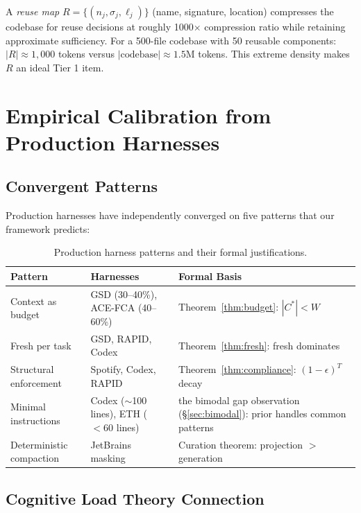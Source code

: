 \documentclass[11pt, a4paper, logo, copyright]{googledeepmind}
\begin{document}
A \emph{reuse map} $R = \{(n_j, \sigma_j, \ell_j)\}$ (name, signature, location) compresses the codebase for reuse decisions at roughly 1000$\times$ compression ratio while retaining approximate sufficiency. For a 500-file codebase with 50 reusable components: $|R| \approx 1{,}000$ tokens versus $|\text{codebase}| \approx 1.5$M tokens. This extreme density makes $R$ an ideal Tier 1 item.


\section{Empirical Calibration from Production Harnesses}
\label{sec:empirical}

\subsection{Convergent Patterns}

Production harnesses have independently converged on five patterns that our framework predicts:

\begin{table}[H]
\centering
\small
\begin{tabularx}{\textwidth}{lXX}
\toprule
\textbf{Pattern} & \textbf{Harnesses} & \textbf{Formal Basis} \\
\midrule
Context as budget & GSD (30--40\%), ACE-FCA (40--60\%) & Theorem~\ref{thm:budget}: $|C^*| < W$ \\
Fresh per task & GSD, RAPID, Codex & Theorem~\ref{thm:fresh}: fresh dominates \\
Structural enforcement & Spotify, Codex, RAPID & Theorem~\ref{thm:compliance}: $(1-\epsilon)^T$ decay \\
Minimal instructions & Codex ($\sim$100 lines), ETH ($<60$ lines) & the bimodal gap observation (\S\ref{sec:bimodal}): prior handles common patterns \\
Deterministic compaction & JetBrains masking & Curation theorem: projection $>$ generation \\
\bottomrule
\end{tabularx}
\caption{Production harness patterns and their formal justifications.}
\label{tab:harness-patterns}
\end{table}

\subsection{Cognitive Load Theory Connection}
\end{document}
